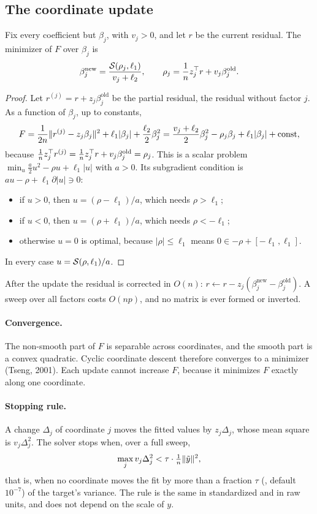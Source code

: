 \subsection{The coordinate update}

\begin{proposition}\label{en:prop:cd}
Fix every coefficient but $\beta_j$, with $v_j>0$, and let $r$ be the current residual. The
minimizer of $F$ over $\beta_j$ is
\[
  \beta_j^{\text{new}}=\frac{\mathcal{S}(\rho_j,\ell_1)}{v_j+\ell_2},\qquad
  \rho_j=\frac1n z_j^\top r+v_j\beta_j^{\text{old}}.
\]
\end{proposition}
\begin{proof}
Let $r^{(j)}=r+z_j\beta_j^{\text{old}}$ be the partial residual, the residual without factor
$j$. As a function of $\beta_j$, up to constants,
\[
  F=\frac1{2n}\lVert r^{(j)}-z_j\beta_j\rVert^2+\ell_1|\beta_j|+\frac{\ell_2}2\beta_j^2
   =\frac{v_j+\ell_2}{2}\beta_j^2-\rho_j\beta_j+\ell_1|\beta_j|+\text{const},
\]
because $\frac1nz_j^\top r^{(j)}=\frac1nz_j^\top r+v_j\beta_j^{\text{old}}=\rho_j$. This is a scalar problem
$\min_u\frac a2u^2-\rho u+\ell_1|u|$ with $a>0$. Its subgradient condition is
$au-\rho+\ell_1\partial|u|\ni0$:
\begin{itemize}
  \item if $u>0$, then $u=(\rho-\ell_1)/a$, which needs $\rho>\ell_1$;
  \item if $u<0$, then $u=(\rho+\ell_1)/a$, which needs $\rho<-\ell_1$;
  \item otherwise $u=0$ is optimal, because $|\rho|\le\ell_1$ means $0\in-\rho+[-\ell_1,\ell_1]$.
\end{itemize}
In every case $u=\mathcal{S}(\rho,\ell_1)/a$.
\end{proof}

After the update the residual is corrected in $O(n)$: $r\leftarrow r-z_j(\beta_j^{\text{new}}-\beta_j^{\text{old}})$.
A sweep over all factors costs $O(np)$, and no matrix is ever formed or inverted.

\paragraph{Convergence.} The non-smooth part of $F$ is separable across coordinates, and the
smooth part is a convex quadratic. Cyclic coordinate descent therefore converges to a
minimizer (Tseng, 2001). Each update cannot increase $F$, because it minimizes $F$
exactly along one coordinate.

\paragraph{Stopping rule.} A change $\Delta_j$ of coordinate $j$ moves the fitted values by
$z_j\Delta_j$, whose mean square is $v_j\Delta_j^2$. The solver stops when, over a full
sweep,
\[
  \max_jv_j\Delta_j^2<\tau\cdot\tfrac1n\lVert \tilde y\rVert^2,
\]
that is, when no coordinate moves the fit by more than a fraction $\tau$ (,
default $10^{-7}$) of the target's variance. The rule is the same in standardized and in
raw units, and does not depend on the scale of $y$.

